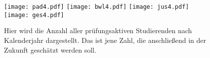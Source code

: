 \begin{figure}[ht]
  \label{fig:abb4}
  \texttt{[image: pad4.pdf]}
  \texttt{[image: bwl4.pdf]}
  \texttt{[image: jus4.pdf]}
  \texttt{[image: ges4.pdf]}
  \caption[prüfungsaktive Studierenden nach Kalenderjahr]{Hier wird die Anzahl aller prüfungsaktiven Studierenden nach Kalenderjahr dargestellt. Das 
  ist jene Zahl, die anschließend in der Zukunft geschätzt werden soll.}
\end{figure}











